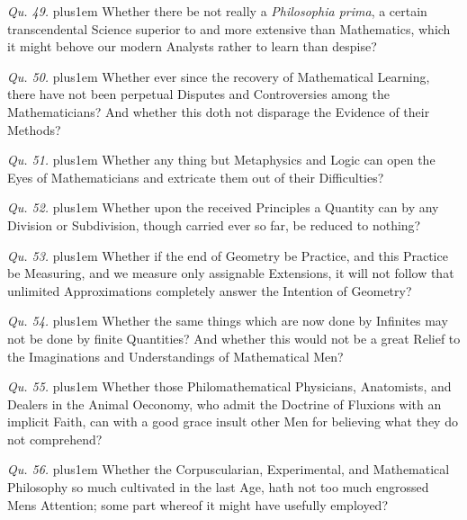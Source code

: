 \item{\it Qu. 49.} \hskip 0pt plus1em
Whether there be not really a {\it Philosophia prima}, a certain
transcendental Science superior to and more extensive than
Mathematics, which it might behove our modern Analysts rather to
learn than despise?


\item{\it Qu. 50.} \hskip 0pt plus1em
Whether ever since the recovery of Mathematical Learning, there
have not been perpetual Disputes and Controversies among the
Mathematicians?  And whether this doth not disparage the Evidence
of their Methods?

\item{\it Qu. 51.} \hskip 0pt plus1em
Whether any thing but Metaphysics and Logic can open the Eyes of
Mathematicians and extricate them out of their Difficulties?

\item{\it Qu. 52.} \hskip 0pt plus1em
Whether upon the received Principles a Quantity can by any
Division or Subdivision, though carried ever so far, be reduced
to nothing?

\item{\it Qu. 53.} \hskip 0pt plus1em
Whether if the end of Geometry be Practice, and this Practice be
Measuring, and we measure only assignable Extensions, it will not
follow that unlimited Approximations completely answer the
Intention of Geometry?


\item{\it Qu. 54.} \hskip 0pt plus1em
Whether the same things which are now done by Infinites may not
be done by finite Quantities?  And whether this would not be a
great Relief to the Imaginations and Understandings of
Mathematical Men?

\item{\it Qu. 55.} \hskip 0pt plus1em
Whether those Philomathematical Physicians, Anatomists, and
Dealers in the Animal Oeconomy, who admit the Doctrine of
Fluxions with an implicit Faith, can with a good grace insult
other Men for believing what they do not comprehend?

\item{\it Qu. 56.} \hskip 0pt plus1em
Whether the Corpuscularian, Experimental, and Mathematical
Philosophy so much cultivated in the last Age, hath not too much
engrossed Mens Attention; some part whereof it might have
usefully employed?

